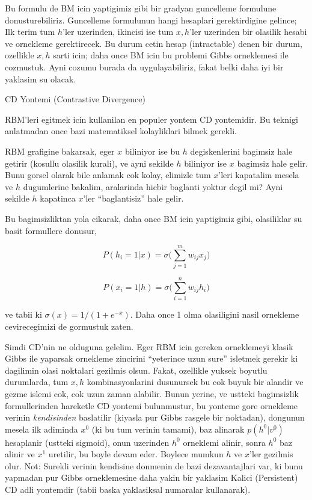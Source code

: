 \documentclass[12pt,fleqn]{article}\usepackage{../common}
\begin{document}
Bu formulu de BM icin yaptigimiz gibi bir gradyan guncelleme formulune
donusturebiliriz. Guncelleme formulunun hangi hesaplari gerektirdigine
gelince; Ilk terim tum $h$'ler uzerinden, ikincisi ise tum $x,h$'ler
uzerinden bir olasilik hesabi ve ornekleme gerektirecek. Bu durum cetin
hesap (intractable) denen bir durum, ozellikle $x,h$ sarti icin; daha once
BM icin bu problemi Gibbs orneklemesi ile cozmustuk. Ayni cozumu burada da
uygulayabiliriz, fakat belki daha iyi bir yaklasim su olacak.

CD Yontemi (Contrastive Divergence) 

RBM'leri egitmek icin kullanilan en populer yontem CD yontemidir. Bu
teknigi anlatmadan once bazi matematiksel kolayliklari bilmek gerekli.

RBM grafigine bakarsak, eger $x$ biliniyor ise bu $h$ degiskenlerini
bagimsiz hale getirir (kosullu olasilik kurali), ve ayni sekilde $h$
biliniyor ise $x$ bagimsiz hale gelir. Bunu gorsel olarak bile anlamak cok
kolay, elimizle tum $x$'leri kapatalim mesela ve $h$ dugumlerine bakalim,
aralarinda hicbir baglanti yoktur degil mi? Ayni sekilde $h$ kapatinca
$x$'ler ``baglantisiz'' hale gelir. 

Bu bagimsizliktan yola cikarak, daha once BM icin yaptigimiz gibi,
olasiliklar su basit formullere donusur,

$$ P(h_i=1|x) = \sigma \bigg( \sum _{j=1}^{m} w_{ij} x_j \bigg) $$

$$ P(x_i=1|h) = \sigma \bigg( \sum _{i=1}^{n} w_{ij} h_i \bigg) $$

ve tabii ki $\sigma(x) = 1 / (1+e^{-x})$. Daha once 1 olma olasiligini
nasil ornekleme cevirecegimizi de gormustuk zaten. 

Simdi CD'nin ne olduguna gelelim. Eger RBM icin gereken orneklemeyi klasik
Gibbs ile yaparsak ornekleme zincirini ``yeterince uzun sure'' isletmek
gerekir ki dagilimin olasi noktalari gezilmis olsun. Fakat, ozellikle
yuksek boyutlu durumlarda, tum $x,h$ kombinasyonlarini dusunursek bu cok
buyuk bir alandir ve gezme islemi cok, cok uzun zaman alabilir. Bunun
yerine, ve ustteki bagimsizlik formullerinden hareketle CD yontemi
bulunmustur, bu yonteme gore ornekleme verinin {\em kendisinden} baslatilir
(kiyasla pur Gibbs rasgele bir noktadan), dongunun mesela ilk adiminda
$x^0$ (ki bu tum verinin tamami), baz alinarak $p(h^0|v^0)$ hesaplanir
(ustteki sigmoid), onun uzerinden $h^0$ orneklemi alinir, sonra $h^0$ baz
alinir ve $x^1$ uretilir, bu boyle devam eder. Boylece mumkun $h$ ve
$x$'ler gezilmis olur. Not: Surekli verinin kendisine donmenin de bazi
dezavantajlari var, ki bunu yapmadan pur Gibbs orneklemesine daha yakin bir
yaklasim Kalici (Persistent) CD adli yontemdir (tabii baska yaklasiksal
numaralar kullanarak).
\end{document}
